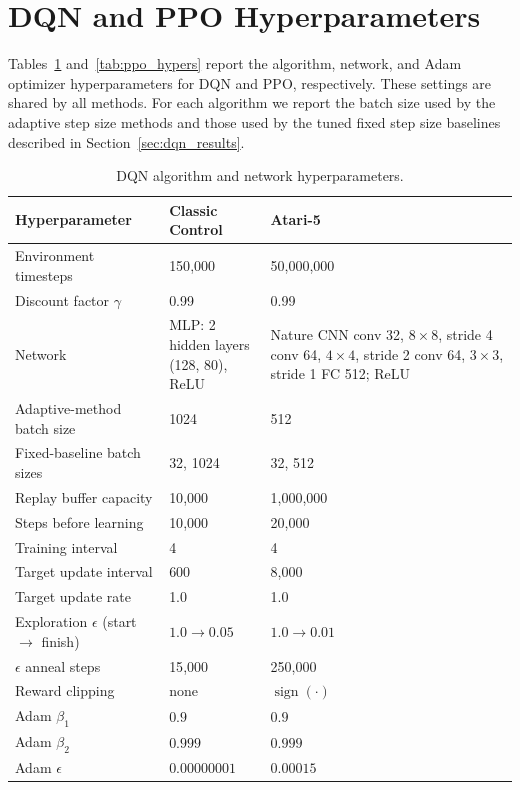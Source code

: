 \section{DQN and PPO Hyperparameters} \label{app_hyperparams}
Tables~\ref{tab:dqn_hypers} and~\ref{tab:ppo_hypers} report the algorithm, network, and Adam optimizer hyperparameters for DQN and PPO, respectively. These settings are shared by all methods. For each algorithm we report the batch size used by the adaptive step size methods and those used by the tuned fixed step size baselines described in Section~\ref{sec:dqn_results}.

\begin{table}[htbp]
\centering
\small
\setlength{\tabcolsep}{6pt}
\renewcommand{\arraystretch}{1.2}
\begin{tabular}{@{}l l l@{}}
\toprule
Hyperparameter & Classic Control & Atari-5 \\
\midrule
Environment timesteps & 150{,}000 & 50{,}000{,}000 \\
Discount factor $\gamma$ & 0.99 & 0.99 \\
Network & \makecell[l]{MLP: 2 hidden layers \\ (128, 80), ReLU} & \makecell[l]{Nature CNN \\ conv 32, $8{\times}8$, stride 4 \\ conv 64, $4{\times}4$, stride 2 \\ conv 64, $3{\times}3$, stride 1 \\ FC 512; ReLU} \\
Adaptive-method batch size & 1024 & 512 \\
Fixed-baseline batch sizes & 32, 1024 & 32, 512 \\
Replay buffer capacity & 10{,}000 & 1{,}000{,}000 \\
Steps before learning & 10{,}000 & 20{,}000 \\
Training interval & 4 & 4 \\
Target update interval & 600 & 8{,}000 \\
Target update rate & 1.0 & 1.0 \\
Exploration $\epsilon$ (start $\to$ finish) & $1.0 \to 0.05$ & $1.0 \to 0.01$ \\
$\epsilon$ anneal steps & 15{,}000 & 250{,}000 \\
Reward clipping & none & $\operatorname{sign}(\cdot)$ \\
Adam $\beta_1$ & $0.9$ & $0.9$ \\
Adam $\beta_2$ & $0.999$ & $0.999$ \\
Adam $\epsilon$ & $0.00000001$ & $0.00015$ \\
\bottomrule
\end{tabular}
\caption{DQN algorithm and network hyperparameters.}
\label{tab:dqn_hypers}
\end{table}

